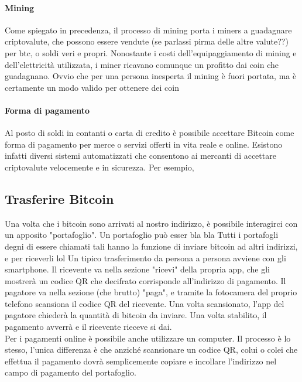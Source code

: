 \documentclass {article}
\begin{document}
\paragraph {Mining}


Come spiegato in precedenza, il processo di mining porta i miners a guadagnare criptovalute, che possono essere vendute (se parlassi pirma delle altre valute??) per btc, o soldi veri e propri.
Nonostante i costi dell'equipaggiamento di mining e dell'elettricità utilizzata, i miner ricavano comunque un profitto dai coin che guadagnano.
Ovvio che per una persona inesperta il mining è fuori portata, ma è certamente un modo valido per ottenere dei coin


\paragraph {Forma di pagamento}


Al posto di soldi in contanti o carta di credito è possibile accettare Bitcoin come forma di pagamento per merce o servizi offerti in vita reale e online.
Esistono infatti diversi sistemi automatizzati che consentono ai mercanti di accettare criptovalute velocemente e in sicurezza.
Per esempio, 


\subsection {Trasferire Bitcoin}


Una volta che i bitcoin sono arrivati al nostro indirizzo, è possibile interagirci con un apposito "portafoglio". Un portafoglio può esser bla bla
Tutti i portafogli degni di essere chiamati tali hanno la funzione di inviare bitcoin ad altri indirizzi, e per riceverli lol
Un tipico trasferimento da persona a persona avviene con gli smartphone.
Il ricevente va nella sezione "ricevi" della propria app, che gli mostrerà un codice QR che decifrato corrisponde all'indirizzo di pagamento.
Il pagatore va nella sezione (che brutto) "paga", e tramite la fotocamera del proprio telefono scansiona il codice QR del ricevente.
Una volta scansionato, l'app del pagatore chiederà la quantità di bitcoin da inviare. Una volta stabilito, il pagamento avverrà e il ricevente rieceve si dai.
\\
Per i pagamenti online è possibile anche utilizzare un computer. Il processo è lo stesso, l'unica differenza è che anziché scansionare un codice QR, colui o colei che effettua il pagamento dovrà semplicemente copiare e incollare l'indirizzo nel campo di pagamento del portafoglio.
\end{document}
